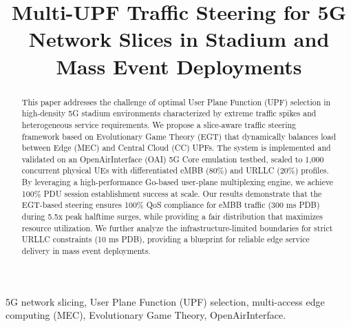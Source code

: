 \documentclass[conference]{IEEEtran}
\begin{document}
\title{Multi-UPF Traffic Steering for 5G Network Slices in Stadium and Mass Event Deployments}

\author{
\and
{}
\and
{}
}
\maketitle

\begin{abstract}
This paper addresses the challenge of optimal User Plane Function (UPF) selection in high-density 5G stadium environments characterized by extreme traffic spikes and heterogeneous service requirements. We propose a slice-aware traffic steering framework based on Evolutionary Game Theory (EGT) that dynamically balances load between Edge (MEC) and Central Cloud (CC) UPFs. The system is implemented and validated on an OpenAirInterface (OAI) 5G Core emulation testbed, scaled to 1,000 concurrent physical UEs with differentiated eMBB (80\%) and URLLC (20\%) profiles. By leveraging a high-performance Go-based user-plane multiplexing engine, we achieve 100\% PDU session establishment success at scale. Our results demonstrate that the EGT-based steering ensures 100\% QoS compliance for eMBB traffic (300 ms PDB) during 5.5x peak halftime surges, while providing a fair distribution that maximizes resource utilization. We further analyze the infrastructure-limited boundaries for strict URLLC constraints (10 ms PDB), providing a blueprint for reliable edge service delivery in mass event deployments.
\end{abstract}

\begin{IEEEkeywords}
5G network slicing, User Plane Function (UPF) selection, multi-access edge computing (MEC), Evolutionary Game Theory, OpenAirInterface.
\end{IEEEkeywords}
\end{document}

